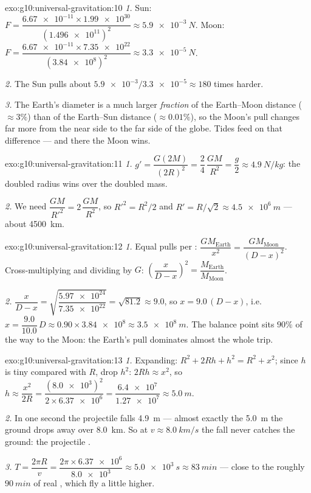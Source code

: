 \begin{solution}{exo:g10:universal-gravitation:10}
\emph{1.} Sun:
$F = \dfrac{\num{6.67e-11} \times \num{1.99e30}}{(\num{1.496e11})^2}
\approx \qty{5.9e-3}{N}$. Moon:
$F = \dfrac{\num{6.67e-11} \times \num{7.35e22}}{(\num{3.84e8})^2}
\approx \qty{3.3e-5}{N}$.

\emph{2.} The Sun pulls about $\num{5.9e-3}/\num{3.3e-5} \approx 180$
times harder.

\emph{3.} The Earth's diameter is a much larger \emph{fraction} of the
Earth--Moon distance ($\approx 3\%$) than of the Earth--Sun distance
($\approx 0.01\%$), so the Moon's pull changes far more from the near
side to the far side of the globe. Tides feed on that difference ---
and there the Moon wins.
\end{solution}

\begin{solution}{exo:g10:universal-gravitation:11}
\emph{1.} $g' = \dfrac{G (2M)}{(2R)^2} = \dfrac{2}{4}\,\dfrac{GM}{R^2}
= \dfrac{g}{2} \approx \qty{4.9}{N/kg}$: the doubled radius wins over
the doubled mass.

\emph{2.} We need $\dfrac{GM}{R'^2} = 2\,\dfrac{GM}{R^2}$, so
$R'^2 = R^2/2$ and $R' = R/\sqrt{2} \approx \qty{4.5e6}{m}$ --- about
\qty{4500}{km}.
\end{solution}

\begin{solution}{exo:g10:universal-gravitation:12}
\emph{1.} Equal pulls per :
$\dfrac{G M_{\text{Earth}}}{x^2} = \dfrac{G M_{\text{Moon}}}{(D-x)^2}$.
Cross-multiplying and dividing by $G$:
$\left(\dfrac{x}{D-x}\right)^2 = \dfrac{M_{\text{Earth}}}{M_{\text{Moon}}}$.

\emph{2.} $\dfrac{x}{D-x}
= \sqrt{\dfrac{\num{5.97e24}}{\num{7.35e22}}} = \sqrt{81.2} \approx
9.0$, so $x = 9.0\,(D - x)$, i.e.\ $x = \dfrac{9.0}{10.0}\,D
\approx 0.90 \times \num{3.84e8} \approx \qty{3.5e8}{m}$. The
balance point sits $90\%$ of the way to the Moon: the Earth's pull
dominates almost the whole trip.
\end{solution}

\begin{solution}{exo:g10:universal-gravitation:13}
\emph{1.} Expanding: $R^2 + 2Rh + h^2 = R^2 + x^2$; since $h$ is tiny
compared with $R$, drop $h^2$: $2Rh \approx x^2$, so
$h \approx \dfrac{x^2}{2R}
= \dfrac{(\num{8.0e3})^2}{2 \times \num{6.37e6}}
= \dfrac{\num{6.4e7}}{\num{1.27e7}} \approx \qty{5.0}{m}$.

\emph{2.} In one second the projectile falls \qty{4.9}{m} --- almost
exactly the \qty{5.0}{m} the ground drops away over \qty{8.0}{km}. So
at $v \approx \qty{8.0}{km/s}$ the fall never catches the ground: the
projectile .

\emph{3.} $T = \dfrac{2\pi R}{v}
= \dfrac{2\pi \times \num{6.37e6}}{\num{8.0e3}}
\approx \qty{5.0e3}{s} \approx \qty{83}{min}$ --- close to the roughly
$\qty{90}{min}$ of real  , which fly a little
higher.
\end{solution}

